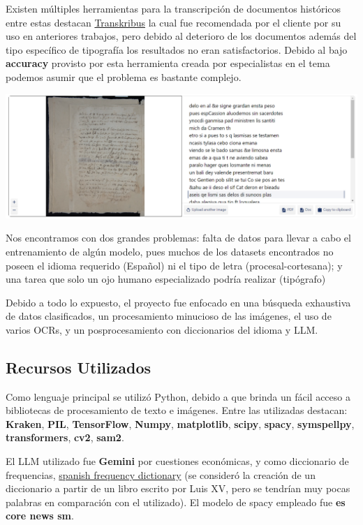 \documentclass[11pt,a4paper]{article}
\begin{document}
Existen m\'ultiples herramientas para la transcripción de documentos hist\'oricos entre estas destacan \href{https://www.transkribus.org/}{Transkribus} la cual fue recomendada por el cliente por su uso en anteriores trabajos, pero debido al deterioro de los documentos adem\'as del tipo espec\'ifico de tipograf\'ia los resultados no eran satisfactorios. Debido al bajo \textbf{accuracy} provisto por esta herramienta creada por especialistas en el tema podemos asumir que el problema es bastante complejo.

\begin{center} \includegraphics[width=1.0\textwidth]{transkribus} \end{center}

Nos encontramos con dos grandes problemas: falta de datos para llevar a cabo el entrenamiento de alg\'un modelo, pues muchos de los datasets encontrados no poseen el idioma requerido (Español) ni el tipo de letra (procesal-cortesana); y una tarea que solo un ojo humano especializado podr\'ia realizar (tip\'ografo)

Debido a todo lo expuesto, el proyecto fue enfocado en una b\'usqueda exhaustiva de datos clasificados, un procesamiento minucioso de las im\'agenes, el uso de varios OCRs, y un posprocesamiento con diccionarios del idioma y LLM.

\subsection{Recursos Utilizados}

Como lenguaje principal se utilizó Python, debido a que brinda un f\'acil acceso a bibliotecas de procesamiento de texto e im\'agenes. Entre las utilizadas destacan: \textbf{Kraken}, \textbf{PIL}, \textbf{TensorFlow}, \textbf{Numpy}, \textbf{matplotlib}, \textbf{scipy}, \textbf{spacy}, \textbf{symspellpy}, \textbf{transformers}, \textbf{cv2}, \textbf{sam2}.

El LLM utilizado fue \textbf{Gemini} por cuestiones económicas, y como diccionario de frequencias, \href{https://github.com/hermitdave/FrequencyWords/blob/master/content/2016/es/es_full.txt}{spanish frequency dictionary} (se consideró la creaci\'on de un diccionario a partir de un libro escrito por Luis XV, pero se tendr\'ian muy pocas palabras en comparaci\'on con el utilizado). El modelo de spacy empleado fue \textbf{es core news sm}.
\end{document}
